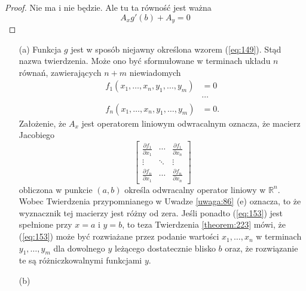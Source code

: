 \documentclass[leqno]{article}
\begin{document}
\begin{justify}
\setcounter{equation}{151}
\begin{proof}
    Nie ma i nie będzie. Ale tu ta równość jest ważna 
    \begin{equation}\label{eq:152}
        A_x g'(b) + A_y = 0
    \end{equation}
\end{proof}

\begin{uwaga}
    \begin{itemize}
        \item [(a)] Funkcja $g$ jest w sposób niejawny określona wzorem (\ref{eq:149}). Stąd nazwa twierdzenia.
            Może ono być sformułowane w terminach układu $n$ równań, zawierających $n+m$ niewiadomych
            \begin{equation}\label{eq:153}
                \begin{aligned}
                    f_1(x_1, \ldots, x_n, y_1, \ldots, y_m) &= 0 \\ 
                    &\cdots  \\
                    f_n(x_1, \ldots, x_n, y_1, \ldots, y_m) &= 0. 
                \end{aligned}
            \end{equation}
        Założenie, że $A_x$ jest operatorem liniowym odwracalnym oznacza, że macierz Jacobiego 
        \begin{equation*}
            \begin{bmatrix}
                \frac{\partial f_1}{\partial x_1} & \cdots & \frac{\partial f_1}{\partial x_n }\\
                \vdots & \ddots & \vdots \\
                \frac{\partial f_n}{\partial x_1} & \cdots & \frac{\partial f_n}{\partial x_n }
            \end{bmatrix}
        \end{equation*}
        obliczona w punkcie $(a,b)$ określa odwracalny operator liniowy w $\mathbb{R}^n$. Wobec Twierdzenia przypomnianego w Uwadze \ref{uwaga:86} (e)
        oznacza, to że wyznacznik tej macierzy jest różny od zera. Jeśli ponadto (\ref{eq:153}) jest spełnione przy $x = a$ i $y = b$, to 
        teza Twierdzenia \ref{theorem:223} mówi, że (\ref{eq:153}) może być rozwiażane przez podanie wartości $x_1, \ldots, x_n$ w terminach $y_1, \ldots, y_m$
        dla dowolnego $y$ leżącego dostatecznie blisko $b$ oraz, że rozwiązanie te są różniczkowalnymi funkcjami $y$.
    \item [(b)]

\end{itemize}
\end{uwaga}
\end{justify}
\end{document}
